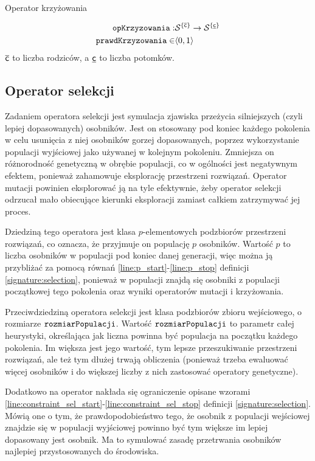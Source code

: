 \documentclass[./FM_mgr.tex]{subfiles}
\begin{document}
\begin{signature}
	\caption{Operator krzyżowania \label{signature:crossover}}
	\begin{align}
		\mathtt{opKrzyzowania}: & {\mathcal{S}}^{ \{ \mathsf{\overline{c}} \}} \rightarrow {\mathcal{S}}^{ \{ \mathsf{\underline{c}} \}} \\
		\mathtt{prawdKrzyzowania} \in & \langle0, 1\rangle
	\end{align}
	$\mathsf{\overline{c}}$ to liczba rodziców, a $\mathsf{\underline{c}}$ to liczba potomków.
\end{signature}	

\subsection{Operator selekcji} \label{subsection:natSel}

Zadaniem operatora selekcji jest symulacja zjawiska przeżycia silniejszych (czyli lepiej dopasowanych) osobników. Jest on stosowany pod koniec każdego pokolenia w celu usunięcia z niej osobników gorzej dopasowanych, poprzez wykorzystanie populacji wyjściowej jako używanej w kolejnym pokoleniu. Zmniejsza on różnorodność genetyczną w obrębie populacji, co w ogólności jest negatywnym efektem, ponieważ zahamowuje  eksplorację przestrzeni rozwiązań. Operator mutacji powinien eksplorować ją na tyle efektywnie, żeby operator selekcji odrzucał mało obiecujące kierunki eksploracji zamiast całkiem zatrzymywać jej proces.

Dziedziną tego operatora jest klasa $p$-elementowych podzbiorów przestrzeni rozwiązań, co oznacza, że przyjmuje on populację $p$ osobników. 
Wartość $p$ to liczba osobników w populacji pod koniec danej generacji, więc można ją przybliżać za pomocą równań \ref{line:p_start}-\ref{line:p_stop} definicji \ref{signature:selection}, ponieważ w populacji znajdą się osobniki z populacji początkowej tego pokolenia oraz wyniki operatorów mutacji i krzyżowania. 

Przeciwdziedziną operatora selekcji jest klasa podzbiorów zbioru wejściowego, o rozmiarze $\mathtt{rozmiarPopulacji}$.
Wartość $\mathtt{rozmiarPopulacji}$ to parametr całej heurystyki, określająca jak liczna powinna być populacja na początku każdego pokolenia. 
Im większa jest jego wartość, tym lepsze przeszukiwanie przestrzeni rozwiązań, ale też tym dłużej trwają obliczenia (ponieważ trzeba ewaluować więcej osobników i do większej liczby z nich zastosować operatory genetyczne). 

Dodatkowo na operator nakłada się ograniczenie opisane wzorami \ref{line:constraint_sel_start}-\ref{line:constraint_sel_stop} definicji \ref{signature:selection}. 
Mówią one o tym, że prawdopodobieństwo tego, że osobnik z populacji wejściowej znajdzie się w populacji wyjściowej powinno być tym większe im lepiej dopasowany jest osobnik. 
Ma to symulować zasadę przetrwania osobników najlepiej przystosowanych do środowiska.
\end{document}
